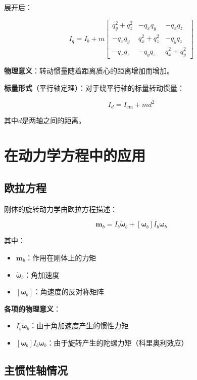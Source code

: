 \documentclass[12pt,a4paper]{article}
\begin{document}
展开后：

\begin{equation}
I_q = I_b + m \begin{bmatrix}
q_y^2 + q_z^2 & -q_x q_y & -q_x q_z \\
-q_x q_y & q_x^2 + q_z^2 & -q_y q_z \\
-q_x q_z & -q_y q_z & q_x^2 + q_y^2
\end{bmatrix}
\end{equation}

\textbf{物理意义}：转动惯量随着距离质心的距离增加而增加。

\textbf{标量形式}（平行轴定理）：对于绕平行轴的标量转动惯量：

\begin{equation}
I_d = I_{\text{cm}} + m d^2
\end{equation}

其中$d$是两轴之间的距离。

\section{在动力学方程中的应用}

\subsection{欧拉方程}

刚体的旋转动力学由欧拉方程描述：

\begin{equation}
\bm{m}_b = I_b \dot{\bm{\omega}}_b + [\bm{\omega}_b] I_b \bm{\omega}_b
\label{eq:euler_equation}
\end{equation}

其中：
\begin{itemize}
\item $\bm{m}_b$：作用在刚体上的力矩
\item $\dot{\bm{\omega}}_b$：角加速度
\item $[\bm{\omega}_b]$：角速度的反对称矩阵
\end{itemize}

\textbf{各项的物理意义}：
\begin{itemize}
\item $I_b \dot{\bm{\omega}}_b$：由于角加速度产生的惯性力矩
\item $[\bm{\omega}_b] I_b \bm{\omega}_b$：由于旋转产生的陀螺力矩（科里奥利效应）
\end{itemize}

\subsection{主惯性轴情况}
\end{document}
